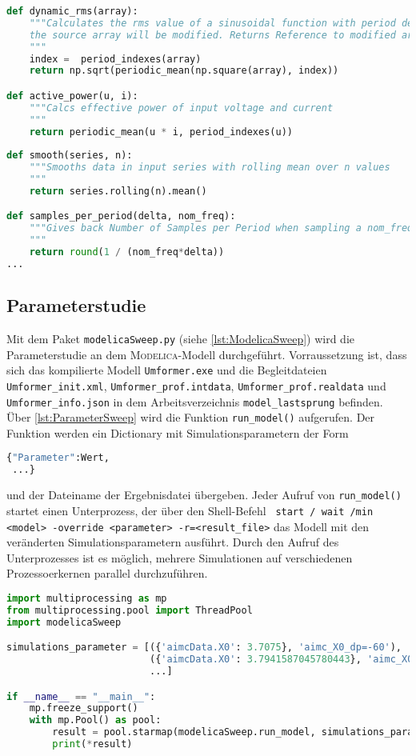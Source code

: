 \begin{lstlisting}[language=python, caption=Auszug aus \texttt{preprocessData.py}, label=lst:PreprocessData,frame=single,framerule=0pt]
def dynamic_rms(array):
    """Calculates the rms value of a sinusoidal function with period detection by zero crossing **in place**, that means,
    the source array will be modified. Returns Reference to modified array.
    """
    index =  period_indexes(array)
    return np.sqrt(periodic_mean(np.square(array), index))

def active_power(u, i):
    """Calcs effective power of input voltage and current
    """
    return periodic_mean(u * i, period_indexes(u))
    
def smooth(series, n):
    """Smooths data in input series with rolling mean over n values
    """
    return series.rolling(n).mean()

def samples_per_period(delta, nom_freq):
    """Gives back Number of Samples per Period when sampling a nom_freq signal with delta 
    """
    return round(1 / (nom_freq*delta))
...
\end{lstlisting}

\subsection{Parameterstudie}
Mit dem Paket \texttt{modelicaSweep.py} (siehe \cref{lst:ModelicaSweep}) wird die Parameterstudie an dem \textsc{Modelica}-Modell durchgeführt. Vorraussetzung ist, dass sich das kompilierte Modell \texttt{Umformer.exe} und die Begleitdateien \texttt{Umformer\_init.xml}, \texttt{Umformer\_prof.intdata}, \texttt{Umformer\_prof.realdata} und \texttt{Umformer\_info.json} in dem Arbeitsverzeichnis \texttt{model\_\-lastsprung} befinden. Über \cref{lst:ParameterSweep} wird die Funktion \texttt{run\_model()} aufgerufen. Der Funktion werden ein Dictionary mit Simulationsparametern der Form \begin{lstlisting}[language=python]
{"Parameter":Wert,
 ...}
\end{lstlisting} und der Dateiname der Ergebnisdatei übergeben. Jeder Aufruf von \texttt{run\_model()} startet einen Unterprozess, der über den Shell-Befehl \texttt{ start / wait /min <model> -override <parameter> -r=<result\_file>} das Modell mit den veränderten Simulationsparametern ausführt. Durch den Aufruf des Unterprozesses ist es möglich, mehrere Simulationen auf verschiedenen Prozessoerkernen parallel durchzuführen.

\begin{lstlisting}[language=python, caption=Ausführen der Parameterstudie mit \texttt{modelicaSweep.py},label=lst:ParameterSweep]
import multiprocessing as mp
from multiprocessing.pool import ThreadPool
import modelicaSweep

simulations_parameter = [({'aimcData.X0': 3.7075}, 'aimc_X0_dp=-60'),
                         ({'aimcData.X0': 3.7941587045780443}, 'aimc_X0_dp=-59'),
                         ...]

if __name__ == "__main__":
    mp.freeze_support()
    with mp.Pool() as pool:
        result = pool.starmap(modelicaSweep.run_model, simulations_parameter)
        print(*result)
\end{lstlisting}

